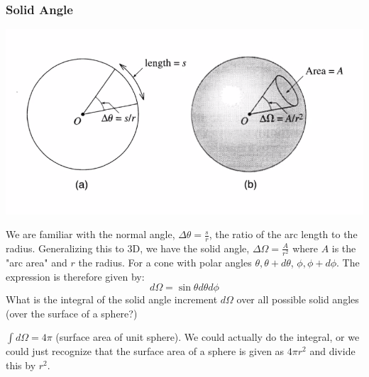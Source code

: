\subsubsection{Solid Angle}
\begin{center}
    \includegraphics[scale=0.5]{Lecture-27/l27-img7.png}
\end{center}
We are familiar with the normal angle, $\Delta \theta = \frac{s}{r}$, the ratio of the arc length to the radius. Generalizing this to 3D, we have the solid angle, $\Delta \Omega = \frac{A}{r^2}$ where $A$ is the "arc area" and $r$ the radius. For a cone with polar angles $\theta, \theta + d\theta$, $\phi, \phi + d\phi$. The expression is therefore given by:
\[d\Omega = \sin\theta d\theta d\phi\]
What is the integral of the solid angle increment $d\Omega$ over all possible solid angles (over the surface of a sphere?)
\begin{s}
$\int d\Omega = 4\pi$ (surface area of unit sphere). We could actually do the integral, or we could just recognize that the surface area of a sphere is given as $4\pi r^2$ and divide this by $r^2$. 
\end{s}

